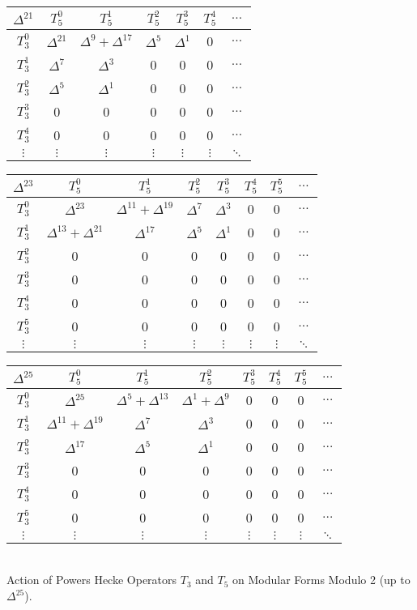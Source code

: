 \begin{center}
\begin{tabular}{|c|cccccc|}
	\textbf{$\Delta^{21}$} & \textbf{$T_5^0$} & \textbf{$T_5^1$} & \textbf{$T_5^2$} & \textbf{$T_5^3$} & \textbf{$T_5^4$} & \textbf{$\dots$} \\\hline
	$T_3^0$ & $\Delta^{21}$ & $\Delta^9 + \Delta^{17}$ & $\Delta^5$ & $\Delta^1$ & 0 & $\dots$ \\
	$T_3^1$ & $\Delta^7$ & $\Delta^3$ & 0 & 0 & 0 & $\dots$ \\
	$T_3^2$ & $\Delta^5$ & $\Delta^1$ & 0 & 0 & 0 & $\dots$ \\
	$T_3^3$ & 0 & 0 & 0 & 0 & 0 & $\dots$ \\
	$T_3^4$ & 0 & 0 & 0 & 0 & 0 & $\dots$ \\
	$\vdots$ & $\vdots$ & $\vdots$ & $\vdots$ & $\vdots$ & $\vdots$ & $\ddots$ \\\hline
\end{tabular}
\begin{tabular}{|c|ccccccc|}
	\hline
	\textbf{$\Delta^{23}$} & \textbf{$T_5^0$} & \textbf{$T_5^1$} & \textbf{$T_5^2$} & \textbf{$T_5^3$} & \textbf{$T_5^4$} & \textbf{$T_5^5$} & \textbf{$\dots$} \\\hline
	$T_3^0$ & $\Delta^{23}$ & $\Delta^{11} + \Delta^{19}$ & $\Delta^7$ & $\Delta^3$ & 0 & 0 & $\dots$ \\
	$T_3^1$ & $\Delta^{13} + \Delta^{21}$ & $\Delta^{17}$ & $\Delta^5$ & $\Delta^1$ & 0 & 0 & $\dots$ \\
	$T_3^2$ & 0 & 0 & 0 & 0 & 0 & 0 & $\dots$ \\
	$T_3^3$ & 0 & 0 & 0 & 0 & 0 & 0 & $\dots$ \\
	$T_3^4$ & 0 & 0 & 0 & 0 & 0 & 0 & $\dots$ \\
	$T_3^5$ & 0 & 0 & 0 & 0 & 0 & 0 & $\dots$ \\
	$\vdots$ & $\vdots$ & $\vdots$ & $\vdots$ & $\vdots$ & $\vdots$ & $\vdots$ & $\ddots$ \\\hline
\end{tabular}
\begin{tabular}{|c|ccccccc|}
	\hline
	\textbf{$\Delta^{25}$} & \textbf{$T_5^0$} & \textbf{$T_5^1$} & \textbf{$T_5^2$} & \textbf{$T_5^3$} & \textbf{$T_5^4$} & \textbf{$T_5^5$} & \textbf{$\dots$} \\\hline
	$T_3^0$ & $\Delta^{25}$ & $\Delta^5 + \Delta^{13}$ & $\Delta^1 + \Delta^9$ & 0 & 0 & 0 & $\dots$ \\
	$T_3^1$ & $\Delta^{11} + \Delta^{19}$ & $\Delta^7$ & $\Delta^3$ & 0 & 0 & 0 & $\dots$ \\
	$T_3^2$ & $\Delta^{17}$ & $\Delta^5$ & $\Delta^1$ & 0 & 0 & 0 & $\dots$ \\
	$T_3^3$ & 0 & 0 & 0 & 0 & 0 & 0 & $\dots$ \\
	$T_3^4$ & 0 & 0 & 0 & 0 & 0 & 0 & $\dots$ \\
	$T_3^5$ & 0 & 0 & 0 & 0 & 0 & 0 & $\dots$ \\
	$\vdots$ & $\vdots$ & $\vdots$ & $\vdots$ & $\vdots$ & $\vdots$ & $\vdots$ & $\ddots$ \\\hline
\end{tabular}\\
Action of Powers Hecke Operators $T_3$ and $T_5$ on Modular Forms Modulo 2 (up to $\Delta^{25}$).
\end{center}
